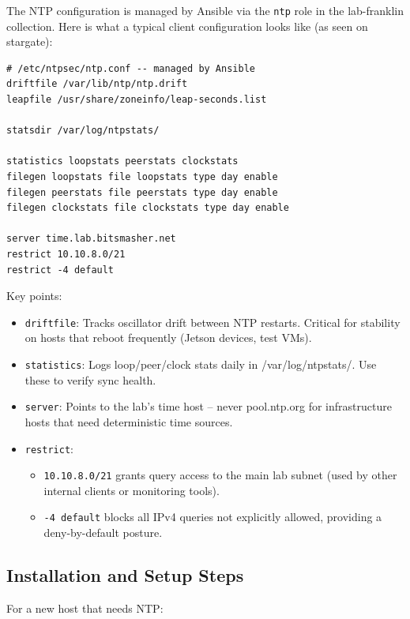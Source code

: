 The NTP configuration is managed by Ansible via the \texttt{ntp} role in the lab-franklin collection. Here is what a typical client configuration looks like (as seen on stargate):

\begin{lstlisting}[style=mystyle]
# /etc/ntpsec/ntp.conf -- managed by Ansible
driftfile /var/lib/ntp/ntp.drift
leapfile /usr/share/zoneinfo/leap-seconds.list

statsdir /var/log/ntpstats/

statistics loopstats peerstats clockstats
filegen loopstats file loopstats type day enable
filegen peerstats file peerstats type day enable
filegen clockstats file clockstats type day enable

server time.lab.bitsmasher.net
restrict 10.10.8.0/21
restrict -4 default
\end{lstlisting}

Key points:
\begin{itemize}
    \item \texttt{driftfile}: Tracks oscillator drift between NTP restarts. Critical for stability on hosts that reboot frequently (Jetson devices, test VMs).
    
    \item \texttt{statistics}: Logs loop/peer/clock stats daily in /var/log/ntpstats/. Use these to verify sync health.
    
    \item \texttt{server}: Points to the lab's time host -- never pool.ntp.org for infrastructure hosts that need deterministic time sources.
    
    \item \texttt{restrict}: 
    \begin{itemize}
        \item \texttt{10.10.8.0/21} grants query access to the main lab subnet (used by other internal clients or monitoring tools).
        
        \item \texttt{-4 default} blocks all IPv4 queries not explicitly allowed, providing a deny-by-default posture.
    \end{itemize}
\end{itemize}

\subsection{Installation and Setup Steps}

For a new host that needs NTP:

